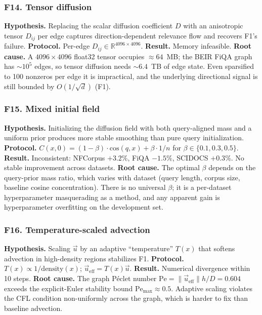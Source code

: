 \documentclass[review,1p,11pt]{elsarticle}
\begin{document}
\subsubsection*{F14. Tensor diffusion}
\textbf{Hypothesis.} Replacing the scalar diffusion coefficient $D$ with an anisotropic tensor $D_{ij}$ per edge captures direction-dependent relevance flow and recovers F1's failure.
\textbf{Protocol.} Per-edge $D_{ij} \in \mathbb{R}^{4096 \times 4096}$.
\textbf{Result.} Memory infeasible.
\textbf{Root cause.} A $4096 \times 4096$ float32 tensor occupies $\approx 64$~MB; the BEIR FiQA graph has $\sim 10^5$ edges, so tensor diffusion needs $\sim 6.4$~TB of edge state. Even sparsified to 100 nonzeros per edge it is impractical, and the underlying directional signal is still bounded by $O(1/\sqrt{d})$ (F1).

\subsubsection*{F15. Mixed initial field}
\textbf{Hypothesis.} Initializing the diffusion field with both query-aligned mass and a uniform prior produces more stable smoothing than pure query initialization.
\textbf{Protocol.} $C(x, 0) = (1-\beta) \cdot \mathrm{cos}(q,x) + \beta \cdot 1/n$ for $\beta \in \{0.1, 0.3, 0.5\}$.
\textbf{Result.} Inconsistent: NFCorpus $+3.2\%$, FiQA $-1.5\%$, SCIDOCS $+0.3\%$. No stable improvement across datasets.
\textbf{Root cause.} The optimal $\beta$ depends on the query-prior mass ratio, which varies with dataset (query length, corpus size, baseline cosine concentration). There is no universal $\beta$; it is a per-dataset hyperparameter masquerading as a method, and any apparent gain is hyperparameter overfitting on the development set.

\subsubsection*{F16. Temperature-scaled advection}
\textbf{Hypothesis.} Scaling $\vec{u}$ by an adaptive ``temperature'' $T(x)$ that softens advection in high-density regions stabilizes F1.
\textbf{Protocol.} $T(x) \propto 1/\mathrm{density}(x)$; $\vec{u}_{\mathrm{eff}} = T(x) \vec{u}$.
\textbf{Result.} Numerical divergence within 10 steps.
\textbf{Root cause.} The graph P\'eclet number $\mathrm{Pe} = \|\vec{u}_{\mathrm{eff}}\| h / D = 0.604$ exceeds the explicit-Euler stability bound $\mathrm{Pe}_{\max} \approx 0.5$. Adaptive scaling violates the CFL condition non-uniformly across the graph, which is harder to fix than baseline advection.
\end{document}
